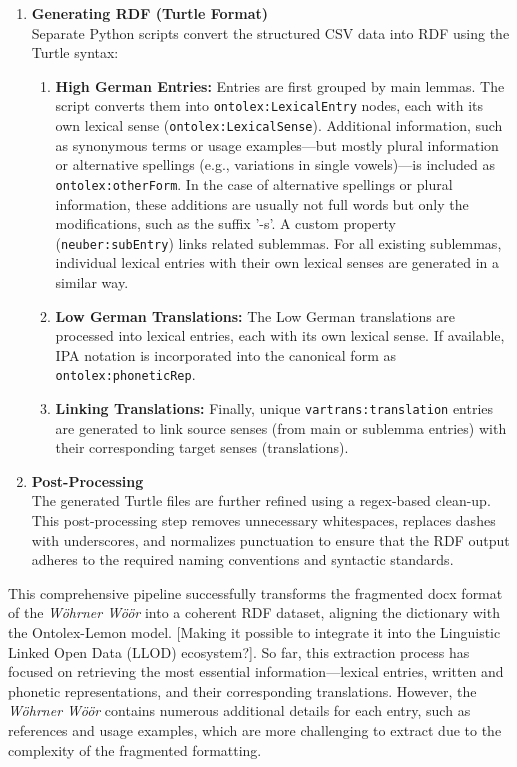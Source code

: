 \begin{enumerate}
    \item {\textbf{Generating RDF (Turtle Format)}}\\ 
    Separate Python scripts convert the structured CSV data into RDF using the Turtle syntax:
    \begin{enumerate}
        \item {\textbf{High German Entries:}} Entries are first grouped by main lemmas. The script converts them into \texttt{ontolex:LexicalEntry} nodes, each with its own lexical sense (\texttt{ontolex:LexicalSense}). Additional information, such as synonymous terms or usage examples—but mostly plural information or alternative spellings (e.g., variations in single vowels)—is included as \texttt{ontolex:otherForm}. In the case of alternative spellings or plural information, these additions are usually not full words but only the modifications, such as the suffix '-s'. A custom property (\texttt{neuber:subEntry}) links related sublemmas. For all existing sublemmas, individual lexical entries with their own lexical senses are generated in a similar way.
        \item {\textbf{Low German Translations:}} The Low German translations are processed into lexical entries, each with its own lexical sense. If available, IPA notation is incorporated into the canonical form as \texttt{ontolex:phoneticRep}.
        \item {\textbf{Linking Translations:}} Finally, unique \texttt{vartrans:translation} entries are generated to link source senses (from main or sublemma entries) with their corresponding target senses (translations).
    \end{enumerate}

    \item {\textbf{Post-Processing}}\\  
    The generated Turtle files are further refined using a regex-based clean-up. This post-processing step removes unnecessary whitespaces, replaces dashes with underscores, and normalizes punctuation to ensure that the RDF output adheres to the required naming conventions and syntactic standards.
\end{enumerate}

This comprehensive pipeline successfully transforms the fragmented docx format of the \emph{Wöhrner Wöör} into a coherent RDF dataset, aligning the dictionary with the Ontolex-Lemon model. [Making it possible to integrate it into the Linguistic Linked Open Data (LLOD) ecosystem?]. So far, this extraction process has focused on retrieving the most essential information—lexical entries, written and phonetic representations, and their corresponding translations. However, the \emph{Wöhrner Wöör} contains numerous additional details for each entry, such as references and usage examples, which are more challenging to extract due to the complexity of the fragmented formatting.

